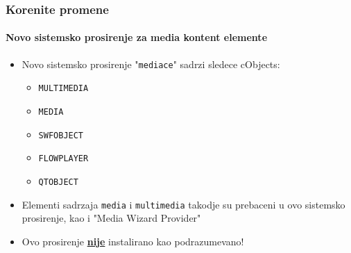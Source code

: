 \begin{frame}[fragile]
	\frametitle{Korenite promene}
	\framesubtitle{Novo sistemsko prosirenje za media kontent elemente}

	\begin{itemize}

		\item Novo sistemsko prosirenje "\texttt{mediace}" sadrzi sledece cObjects:

			\begin{itemize}
				\item \texttt{MULTIMEDIA}
				\item \texttt{MEDIA}
				\item \texttt{SWFOBJECT}
				\item \texttt{FLOWPLAYER}
				\item \texttt{QTOBJECT}
			\end{itemize}

		\item Elementi sadrzaja \texttt{media} i \texttt{multimedia} takodje su prebaceni u ovo sistemsko prosirenje, kao i "Media Wizard Provider"

		\item Ovo prosirenje \underline{\textbf{nije}} instalirano kao podrazumevano!

	\end{itemize}

\end{frame}

